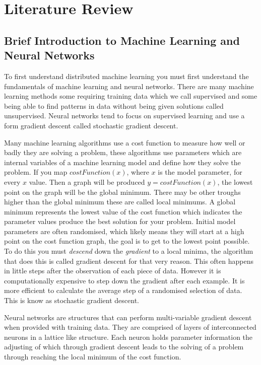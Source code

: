 \clearpage
\section{Literature Review}
\subsection{Brief Introduction to Machine Learning and Neural Networks}
To first understand distributed machine learning you must first understand the
fundamentals of machine learning and neural networks. There are many machine
learning methods some requiring training data which we call supervised and some
being able to find patterns in data without being given solutions called
unsupervised. \cite{alpaydin2020introduction} Neural networks tend to focus on
supervised learning and use a form gradient descent called stochastic gradient
descent.

Many machine learning algorithms use a cost function to measure how well or
badly they are solving a problem, these algorithms use parameters which are
internal variables of a machine learning model and define how they solve the
problem. If you map \(costFunction(x)\), where \(x\) is the model parameter, for
every \(x\) value. Then a graph will be produced \(y = costFunction(x)\), the
lowest point on the graph will be the global minimum. There may be other troughs
higher than the global minimum these are called local minimums. A global minimum
represents the lowest value of the cost function which indicates the parameter
values produce the best solution for your problem. Initial model parameters are
often randomised, which likely means they will start at a high point on the cost
function graph, the goal is to get to the lowest point possible. To do this you
must \textit{descend} down the \textit{gradient} to a local minima, the
algorithm that does this is called gradient descent for that very reason. This
often happens in little steps after the observation of each piece of data.
However it is computationally expensive to step down the gradient after each
example. It is more efficient to calculate the average step of a randomised
selection of data. This is know as stochastic gradient descent.

Neural networks are structures that can perform multi-variable gradient descent
when provided with training data. They are comprised of layers of
interconnected neurons in a lattice like structure. Each neuron holds parameter
information the adjusting of which through gradient descent leads to the solving
of a problem through reaching the local minimum of the cost function.

